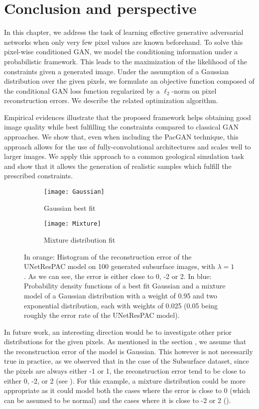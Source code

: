 \section{Conclusion and perspective}

In this chapter, we address the task of learning effective generative adversarial networks when only very few pixel values are known beforehand. To solve this pixel-wise conditioned GAN, we model the conditioning information under a probabilistic framework. This leads to the maximization of the likelihood of the constraints given a
generated image. Under the assumption of a Gaussian distribution over the given pixels, we formulate an objective function composed of the conditional GAN loss function regularized by a $\ell_2$-norm on pixel reconstruction errors. We describe the related optimization algorithm.

Empirical evidences illustrate that the proposed framework helps obtaining good image quality while best fulfilling the constraints compared to classical GAN approaches. We show that, even when including the PacGAN technique,  this approach  allows for the use of fully-convolutional architectures and scales well to larger images. We apply this approach to a common geological simulation task and show that it allows the generation of realistic samples which fulfill the prescribed constraints.
\begin{figure}[t]
	
	\begin{subfigure}[t]{0.5\textwidth}
		\centering
		\texttt{[image: Gaussian]}
		\caption{Gaussian best fit}
		\label{fig:rec_error}
	\end{subfigure}\begin{subfigure}[t]{0.5\textwidth}
		\centering
		\texttt{[image: Mixture]}
		\caption{Mixture distribution fit}
		\label{fig:mixture_dist}
	\end{subfigure}	
	\caption[Better modeling of the reconstruction error on the Subsurface dataset]{In orange: Histogram of the reconstruction error of the UNetResPAC model on 100 generated subsurface images, with $\lambda = 1$. As we can see, the error is either close to 0, -2 or 2. In blue: Probability density functions of a best fit Gaussian and a mixture model of a Gaussian distribution with a weight of 0.95 and two exponential distribution, each with weights of 0.025 (0.05 being roughly the error rate of the UNetResPAC model).}
\end{figure}

In future work, an interesting direction would be to investigate other prior distributions for the given pixels. As mentioned in the section , we assume that the reconstruction error of the model is Gaussian. This however is not necessarily true in practice, as we observed that in the case of the Subsurface dataset, since the pixels are always either -1 or 1, the reconstruction error tend to be close to either 0, -2, or 2 (see ). For this example, a mixture distribution could be more appropriate as it could model both the cases where the error is close to 0 (which can be assumed to be normal) and the cases where it is close to -2 or 2 (). 


